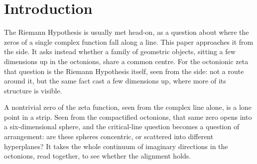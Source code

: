 \documentclass[11pt]{article}
\newcommand{\OO}{\mathbb{O}}
\newcommand{\Ostar}{\OO^{*}}
\newcommand{\zetaO}{\zeta_{\Ostar}}
\theoremstyle{plain}
\theoremstyle{definition}
\theoremstyle{remark}
\begin{document}
\begin{abstract}
The C-residue system is the inverse-image action groupoid
$\mathcal R_A$ selected inside $\mathcal A_A$, with fully faithful inclusion
$\iota_A:\mathcal R_A\Rightarrow\mathcal A_A$, and hence a fully faithful inclusion of totals
$\int\iota_A:\int_{\mathcal B}\mathcal R_A\hookrightarrow\mathcal T_A$. The relative
orbit--stabilizer comparison makes this inverse-image total transitive, therefore connected, and
its component colimit is consequently a singleton. Each certified residue representative carries
a real read, the real coordinate of its zero-sphere. The singleton identifies the component
classes of any two representatives; it does not identify their reads, because no cocone,
descent law, or invariance law for the read along the transports is established, and none can
be in general: the class of A-sections contains $(q^{2}+1)\,\zetaO$, a member satisfying
\textup{(C1)--(C4)} whose zero-spheres are centred at $0$ and at the real parts of the zeta
zeros. The unrestricted concentricity theorem asserted in earlier versions of this paper is
therefore false, and is withdrawn.

What survives is exact and zeta-specific. Pairwise equality of the certified reads is the same
proposition as concentricity of the enumerated zero-spheres, and for $\zetaO$ both are
equivalent to the Riemann Hypothesis; under the Riemann Hypothesis the common centre and the
common read are $\tfrac12$. These are geometric and categorical reformulations of the Riemann
Hypothesis, formalized in Lean without placeholders. They are not a proof of it.
\end{abstract}


\tableofcontents

\section*{Introduction}
The Riemann Hypothesis is usually met head-on, as a question about where the zeros of a single complex function fall along a line. This paper approaches it from the side. It asks instead whether a family of geometric objects, sitting a few dimensions up in the octonions, share a common centre. For the octonionic zeta that question is the Riemann Hypothesis itself, seen from the side: not a route around it, but the same fact cast a few dimensions up, where more of its structure is visible.

A nontrivial zero of the zeta function, seen from the complex line alone, is a lone point in a strip. Seen from the compactified octonions, that same zero opens into a six-dimensional sphere, and the critical-line question becomes a question of arrangement: are these spheres concentric, or scattered into different hyperplanes? It takes the whole continuum of imaginary directions in the octonions, read together, to see whether the alignment holds.
\end{document}
